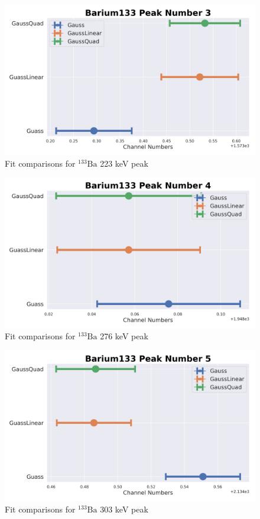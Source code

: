 \documentclass[11pt,a4paper]{article}
\newcommand{\element}[2]{$^{#2}\textrm{#1}$}
\begin{document}
\begin{figure}[H]
  \centering
  \includegraphics[width=0.95\linewidth]{./Images/Barium133/FitComparison_Peak3.png}
  \caption{Fit comparisons for \element{Ba}{133} 223 keV peak}
\end{figure}

\begin{figure}[H]
  \centering
  \includegraphics[width=0.95\linewidth]{./Images/Barium133/FitComparison_Peak4.png}
  \caption{Fit comparisons for \element{Ba}{133} 276 keV peak}
\end{figure}

\begin{figure}[H]
  \centering
  \includegraphics[width=0.95\linewidth]{./Images/Barium133/FitComparison_Peak5.png}
  \caption{Fit comparisons for \element{Ba}{133} 303 keV peak}
\end{figure}
\end{document}
